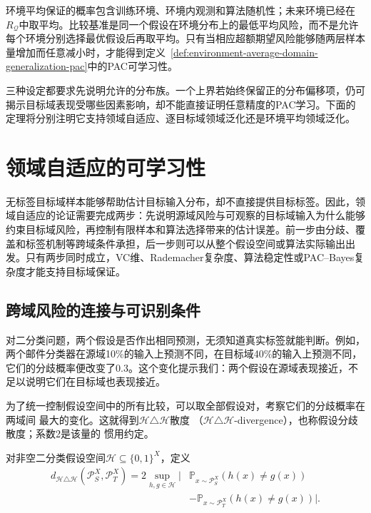 环境平均保证的概率包含训练环境、环境内观测和算法随机性；未来环境已经在$R_{\mathcal Q}$中取平均。比较基准是同一个假设在环境分布上的最低平均风险，而不是允许每个环境分别选择最优假设后再取平均。只有当相应超额期望风险能够随两层样本量增加而任意减小时，才能得到定义~\ref{def:environment-average-domain-generalization-pac}中的PAC可学习性。

三种设定都要求先说明允许的分布族。一个上界若始终保留正的分布偏移项，仍可揭示目标域表现受哪些因素影响，却不能直接证明任意精度的PAC学习。下面的定理将分别注明它支持领域自适应、逐目标域领域泛化还是环境平均领域泛化。

\section{领域自适应的可学习性}
\label{sec:domain-adaptation}

无标签目标域样本能够帮助估计目标输入分布，却不直接提供目标标签。因此，领域自适应的论证需要完成两步：先说明源域风险与可观察的目标域输入为什么能够约束目标域风险，再控制有限样本和算法选择带来的估计误差。前一步由分歧、覆盖和标签机制等跨域条件承担，后一步则可以从整个假设空间或算法实际输出出发。只有两步同时成立，VC维、Rademacher复杂度、算法稳定性或PAC--Bayes复杂度才能支持目标域保证。

\subsection{跨域风险的连接与可识别条件}
\label{sec:adaptation-risk}

对二分类问题，两个假设是否作出相同预测，无须知道真实标签就能判断。例如，两个邮件分类器在源域10\%的输入上预测不同，在目标域40\%的输入上预测不同，它们的分歧概率便改变了0.3。这个变化提示我们：两个假设在源域表现接近，不足以说明它们在目标域也表现接近。

为了统一控制假设空间中的所有比较，可以取全部假设对，考察它们的分歧概率在两域间
最大的变化。这就得到$\mathcal H\triangle\mathcal H$散度
（$\mathcal H\triangle\mathcal H$-divergence），也称假设分歧散度；系数2是该量的
惯用约定。

\begin{definition}[假设分歧散度]
\label{def:h-delta-h-divergence}
对非空二分类假设空间$\mathcal H\subseteq\{0,1\}^{X}$，定义
\begin{equation}
 \begin{aligned}
 d_{\mathcal H\triangle\mathcal H}(\mathcal P_S^X,\mathcal P_T^X)
 =2\sup_{h,g\in\mathcal H}
 \big|&\mathbb P_{x\sim\mathcal P_S^X}(h(x)\neq g(x))\\
       &-\mathbb P_{x\sim\mathcal P_T^X}(h(x)\neq g(x))\big|.
 \end{aligned}
 \label{eq:h-delta-h-divergence}
\end{equation}
\end{definition}

